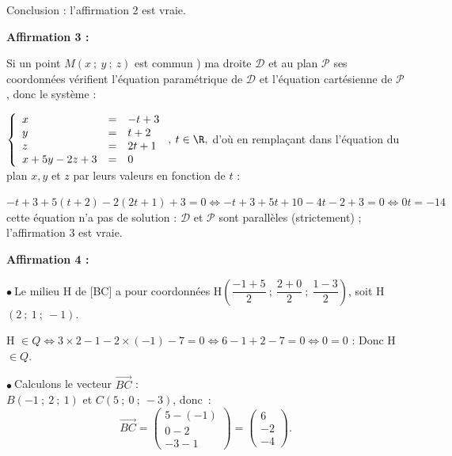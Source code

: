 Conclusion : l'affirmation 2 est vraie.

\medskip

\textbf{Affirmation 3 :}

Si un point $M(x~;~y~;~z)$ est commun ) ma droite $\mathcal{D}$ et au plan $\mathcal{P}$ ses coordonnées vérifient l'équation paramétrique de $\mathcal{D}$ et l'équation cartésienne de $\mathcal{P}$, donc le système :

$\left\{\begin{array}{l c l}
x&=&-t +3\\
y&=&t+ 2\\
z &=& 2t +1\\
x + 5y - 2z + 3&=&0
\end{array}\right., \: t \in \R,$ d'où en remplaçant dans l'équation du plan $x, y$ et $z$ par leurs valeurs en fonction de $t$ :


$- t + 3 + 5(t + 2) - 2(2t + 1)  + 3 = 0 \iff -t + 3 + 5t + 10 - 4t - 2 + 3 = 0 \iff 0t = - 14$  cette équation n'a pas de solution : $\mathcal{D}$ et $\mathcal{P}$ sont parallèles (strictement) ; l'affirmation 3 est vraie.
\medskip

\textbf{Affirmation 4 :}



$\bullet~$Le milieu H de [BC] a pour coordonnées H$\left(\dfrac{-1 + 5}{2}~;~\dfrac{2 + 0}{2}~;~\dfrac{1 - 3}{2}\right)$, soit H$(2~;~1~;~-1)$.

H $\in Q \iff 3 \times 2 - 1 - 2 \times (-1) - 7 = 0 \iff 6 - 1 + 2 - 7 = 0 \iff 0 = 0$ : Donc H $\in Q$.

\vspace{0.5em}

$\bullet~$Calculons le vecteur $\vec{BC}$ :\\
$B(-1~;~2~;~1)$ et $C(5~;~0~;~-3)$, donc~:
\[
\vec{BC} = \begin{pmatrix} 5 - (-1) \\ 0 - 2 \\ -3 - 1 \end{pmatrix} = \begin{pmatrix} 6 \\ -2 \\ -4 \end{pmatrix}.
\]

